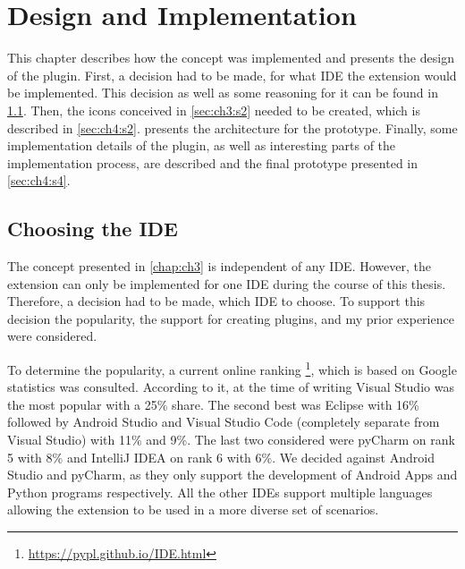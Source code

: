 
\chapter{Design and Implementation}
\label{chap:ch4}
This chapter describes how the concept was implemented and presents the design of the plugin.
First, a decision had to be made, for what \gls{IDE} the extension would be implemented.
This decision as well as some reasoning for it can be found in \cref{sec:ch4:s1}.
Then, the icons conceived in \cref{sec:ch3:s2} needed to be created, which is described in \cref{sec:ch4:s2}.
 presents the architecture for the prototype.
Finally, some implementation details of the plugin, as well as interesting parts of the implementation process, are described 
and the final prototype presented in \cref{sec:ch4:s4}.

\section{Choosing the IDE}
\label{sec:ch4:s1}
The concept presented in \cref{chap:ch3} is independent of any \gls{IDE}.
However, the extension can only be implemented for one \gls{IDE} during the course of this thesis.
Therefore, a decision had to be made, which \gls{IDE} to choose.
To support this decision the popularity, the support for creating plugins, and my prior experience were considered.

To determine the popularity, a current online ranking \footnote{\url{https://pypl.github.io/IDE.html}}, which is based on Google statistics was consulted.
According to it, at the time of writing Visual Studio was the most popular with a 25\% share.
The second best was \gls{Eclipse} with 16\% followed by Android Studio and Visual Studio Code (completely separate from Visual Studio) with 11\% and 9\%.
The last two considered were pyCharm on rank 5 with 8\% and IntelliJ IDEA on rank 6 with 6\%.
We decided against Android Studio and pyCharm, as they only support the development of Android Apps and Python programs respectively.
All the other \glspl{IDE} support multiple languages allowing the extension to be used in a more diverse set of scenarios.

